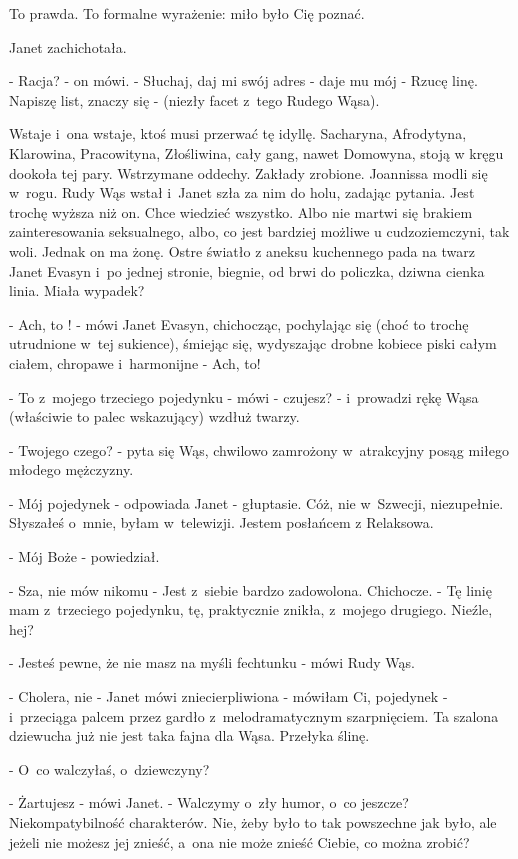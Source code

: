 \documentclass[oneside,polish,12pt,sfheadings]{mwbk}
\begin{document}
To prawda. To formalne wyrażenie: miło było Cię poznać.

Janet zachichotała.

- Racja? - on mówi. - Słuchaj, daj mi swój adres - daje mu mój - Rzucę
linę. Napiszę list, znaczy się - (niezły facet z~tego Rudego Wąsa).

Wstaje i~ona wstaje, ktoś musi przerwać tę idyllę. Sacharyna, Afrodytyna,
Klarowina, Pracowityna, Złośliwina, cały gang, nawet Domowyna, stoją
w kręgu dookoła tej pary. Wstrzymane oddechy. Zakłady zrobione. Joannissa
modli się w~rogu. Rudy Wąs wstał i~Janet szła za nim do holu, zadając
pytania. Jest trochę wyższa niż on. Chce wiedzieć wszystko. Albo nie
martwi się brakiem zainteresowania seksualnego, albo, co jest bardziej
możliwe u cudzoziemczyni, tak woli. Jednak on ma żonę. Ostre światło
z aneksu kuchennego pada na twarz Janet Evasyn i~po jednej stronie,
biegnie, od brwi do policzka, dziwna cienka linia. Miała wypadek?

- Ach, to ! - mówi Janet Evasyn, chichocząc, pochylając się (choć
to trochę utrudnione w~tej sukience), śmiejąc się, wydyszając drobne
kobiece piski całym ciałem, chropawe i~harmonijne - Ach, to!

- To z~mojego trzeciego pojedynku - mówi - czujesz? - i~prowadzi rękę
Wąsa (właściwie to palec wskazujący) wzdłuż twarzy.

- Twojego czego? - pyta się Wąs, chwilowo zamrożony w~atrakcyjny posąg
miłego młodego mężczyzny.

- Mój pojedynek - odpowiada Janet - głuptasie. Cóż, nie w~Szwecji,
niezupełnie. Słyszałeś o~mnie, byłam w~telewizji. Jestem posłańcem
z Relaksowa.

- Mój Boże - powiedział.

- Sza, nie mów nikomu - Jest z~siebie bardzo zadowolona. Chichocze. -
Tę linię mam z~trzeciego pojedynku, tę, praktycznie znikła, z~mojego
drugiego. Nieźle, hej?

- Jesteś pewne, że nie masz na myśli fechtunku - mówi Rudy Wąs.

- Cholera, nie - Janet mówi zniecierpliwiona - mówiłam Ci, pojedynek
- i~przeciąga palcem przez gardło z~melodramatycznym szarpnięciem.
Ta szalona dziewucha już nie jest taka fajna dla Wąsa. Przełyka ślinę.

- O~co walczyłaś, o~dziewczyny?

- Żartujesz - mówi Janet. - Walczymy o~zły humor, o~co jeszcze? Niekompatybilność charakterów. Nie, żeby było to tak powszechne jak
było, ale jeżeli nie możesz jej znieść, a~ona nie może znieść Ciebie,
co można zrobić?
\end{document}

